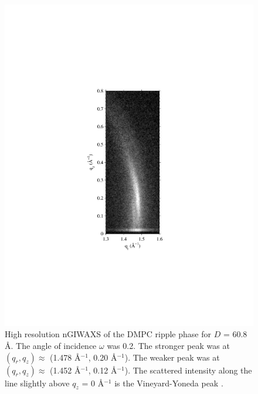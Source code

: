 \begin{figure}[htbp]
  \centering
  \includegraphics[trim=100 170 100 170,clip,width=\textwidth]{figures/ripple/nGIWAXS/dmpc1_enlarge}
  \caption{High resolution nGIWAXS of the DMPC ripple phase for $D$ = 60.8 \AA.
  The angle of incidence $\omega$ was 0.2\textdegree. The stronger peak was at
  $(q_r, q_z) \approx$ (1.478 \AA$^{-1}$, 0.20 \AA$^{-1}$). 
  The weaker peak was at 
  $(q_r, q_z) \approx$ (1.452 \AA$^{-1}$, 0.12 \AA$^{-1}$). The scattered
  intensity along the line slightly above $q_z$ = 0 \AA$^{-1}$ is the Vineyard-Yoneda
  peak \cite{ref:Vineyard82,ref:Miller08}.}
  \label{fig:nGIWAXS_enlarge}
\end{figure}

